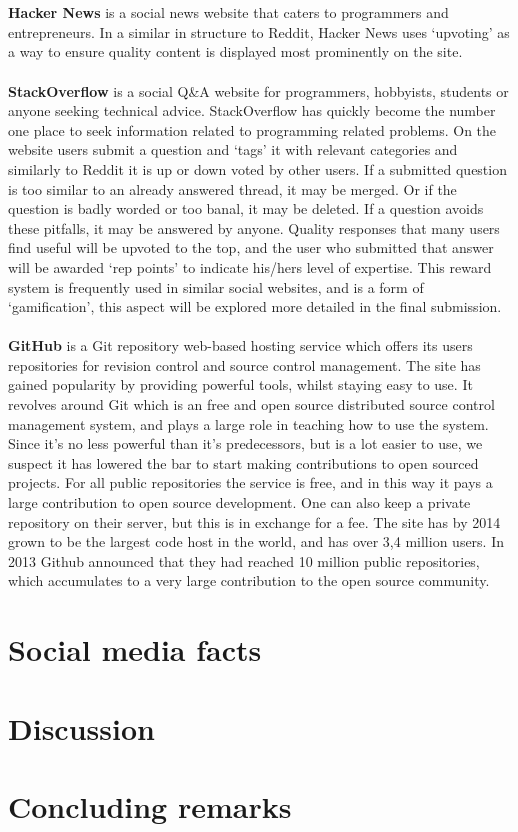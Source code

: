 \documentclass[a4paper,11pt,oneside]{book} %
\begin{document}
\\\\
\textbf{Hacker News} is a social news website that caters to programmers and entrepreneurs. In a similar in structure to Reddit, Hacker News uses ‘upvoting’ as a way to ensure quality content is displayed most prominently on the site.
\\\\
\textbf{StackOverflow} is a social Q\&A website for programmers, hobbyists, students or anyone seeking technical advice. StackOverflow has quickly become the number one place to seek information related to programming related problems. On the website users submit a question and ‘tags’ it with relevant categories and similarly to Reddit it is up or down voted by other users. If a submitted question is too similar to an already answered thread, it may be merged. Or if the question is badly worded or too banal, it may be deleted. If a question avoids these pitfalls, it may be answered by anyone. Quality responses that many users find useful will be upvoted to the top, and the user who submitted that answer will be awarded ‘rep points’ to indicate his/hers level of expertise. This reward system is frequently used in similar social websites, and is a form of ‘gamification’, this aspect will be explored more detailed in the final submission.
\\\\
\textbf{GitHub} is a Git repository web-based hosting service which offers its users repositories for revision control and source control management. The site has gained popularity by providing powerful tools, whilst staying easy to use. It revolves around Git which is an free and open source distributed source control management system, and plays a large role in teaching how to use the system. Since it’s no less powerful than it’s predecessors, but is a lot easier to use, we suspect it has lowered the bar to start making contributions to open sourced projects. For all public repositories the service is free, and in this way it pays a large contribution to open source development. One can also keep a private repository on their server, but this is in exchange for a fee. The site has by 2014 grown to be the largest code host in the world, and has over 3,4 million users. In 2013 Github announced that they had reached 10 million public repositories, which accumulates to a very large contribution to the open source community.








\newpage{}

\section{Social media facts}

\section{Discussion}

\section{Concluding remarks}

\backmatter

\printbibliography
 
\end{document}
